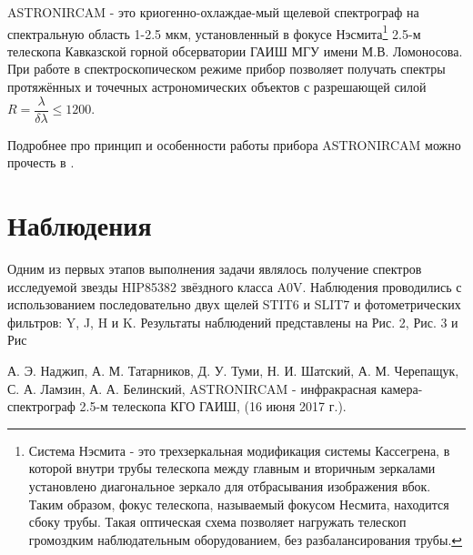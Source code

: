 \documentclass[a4paper]{article}
\begin{document}
ASTRONIRCAM - это криогенно-охлаждае-мый щелевой спектрограф на спектральную область 1-2.5 мкм, установленный в фокусе Нэсмита\footnote{Система Нэсмита - это трехзеркальная модификация системы Кассегрена, в которой внутри трубы телескопа между главным и вторичным зеркалами установлено диагональное зеркало для отбрасывания изображения вбок. Таким образом, фокус телескопа, называемый фокусом Несмита, находится сбоку трубы. Такая оптическая схема позволяет нагружать телескоп громоздким наблюдательным оборудованием, без разбалансирования трубы.} 2.5-м телескопа Кавказской горной обсерватории ГАИШ МГУ имени М.В. Ломоносова. При работе в спектроскопическом режиме прибор позволяет получать спектры протяжённых и точечных астрономических объектов с разрешающей силой $R = \dfrac{\lambda}{\delta\lambda}\leq 1200$.

Подробнее про принцип и особенности работы прибора ASTRONIRCAM можно прочесть в \cite{Sulsky1994}.

\hfill\break

\section{Наблюдения}
Одним из первых этапов выполнения задачи являлось получение спектров исследуемой звезды HIP85382 звёздного класса A0V. Наблюдения проводились с использованием последовательно двух щелей STIT6 и SLIT7 и фотометрических фильтров: Y, J, H и K. Результаты наблюдений представлены на Рис. 2, Рис. 3 и Рис








\hfill\break

\begin{thebibliography}{3}
А. Э. Наджип, А. М. Татарников, Д. У. Туми, Н. И. Шатский, А. М. Черепащук, С. А. Ламзин, А. А. Белинский,  ASTRONIRCAM - инфракрасная камера-спектрограф 2.5-м телескопа КГО ГАИШ, (16 июня 2017 г.).
\end{thebibliography}
\end{document}
